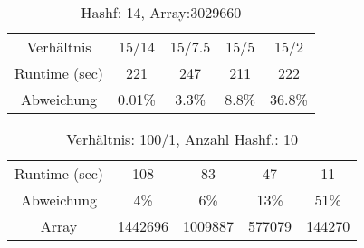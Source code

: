 \documentclass{beamer}
\begin{document}
\begin{frame}

 \begin{table}[h]
	\begin{tabular}{c|c|c|c|c}
		Verhältnis&15/14&15/7.5&15/5&15/2\\
		Runtime (sec)& 221&247&211&222\\
		Abweichung& 0.01\%& 3.3\%&8.8\%&36.8\%\\
			 		
	\end{tabular}
	\caption{Hashf: 14, Array:3029660 }
	\label{tab:meinetabelle1}
\end{table}
\begin{table}[h]
			 	
	\begin{tabular}{c|c|c|c|c}
		Runtime (sec)& 108&83&47&11\\
		Abweichung&4\%&6\%&13\%&51\%\\
		Array& 1442696&1009887&577079&144270\\
			 		
	\end{tabular}
	\caption{Verhältnis: 100/1, Anzahl Hashf.: 10 }
	\label{tab:meinetabelle2}
\end{table}
\end{frame}			 
\end{document}

